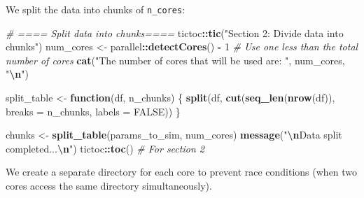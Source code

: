 \documentclass[
]{article}
\newenvironment{Shaded}{\begin{snugshade}}{\end{snugshade}}
\newcommand{\AttributeTok}[1]{\textcolor[rgb]{0.13,0.29,0.53}{#1}}
\newcommand{\CommentTok}[1]{\textcolor[rgb]{0.56,0.35,0.01}{\textit{#1}}}
\newcommand{\ConstantTok}[1]{\textcolor[rgb]{0.56,0.35,0.01}{#1}}
\newcommand{\ControlFlowTok}[1]{\textcolor[rgb]{0.13,0.29,0.53}{\textbf{#1}}}
\newcommand{\DecValTok}[1]{\textcolor[rgb]{0.00,0.00,0.81}{#1}}
\newcommand{\FunctionTok}[1]{\textcolor[rgb]{0.13,0.29,0.53}{\textbf{#1}}}
\newcommand{\NormalTok}[1]{#1}
\newcommand{\OtherTok}[1]{\textcolor[rgb]{0.56,0.35,0.01}{#1}}
\newcommand{\SpecialCharTok}[1]{\textcolor[rgb]{0.81,0.36,0.00}{\textbf{#1}}}
\newcommand{\StringTok}[1]{\textcolor[rgb]{0.31,0.60,0.02}{#1}}
\begin{document}
We split the data into chunks of \texttt{n\_cores}:

\begin{Shaded}
\begin{Highlighting}[]
\CommentTok{\# ==== Split data into chunks====}
\NormalTok{tictoc}\SpecialCharTok{::}\FunctionTok{tic}\NormalTok{(}\StringTok{"Section 2: Divide data into chunks"}\NormalTok{)}
\NormalTok{num\_cores }\OtherTok{\textless{}{-}}\NormalTok{ parallel}\SpecialCharTok{::}\FunctionTok{detectCores}\NormalTok{() }\SpecialCharTok{{-}} \DecValTok{1}  \CommentTok{\# Use one less than the total number of cores}
\FunctionTok{cat}\NormalTok{(}\StringTok{"The number of cores that will be used are: "}\NormalTok{, num\_cores, }\StringTok{"}\SpecialCharTok{\textbackslash{}n}\StringTok{"}\NormalTok{)}

\NormalTok{split\_table }\OtherTok{\textless{}{-}} \ControlFlowTok{function}\NormalTok{(df, n\_chunks) \{}
  \FunctionTok{split}\NormalTok{(df, }\FunctionTok{cut}\NormalTok{(}\FunctionTok{seq\_len}\NormalTok{(}\FunctionTok{nrow}\NormalTok{(df)), }\AttributeTok{breaks =}\NormalTok{ n\_chunks, }\AttributeTok{labels =} \ConstantTok{FALSE}\NormalTok{))}
\NormalTok{\}}

\NormalTok{chunks }\OtherTok{\textless{}{-}} \FunctionTok{split\_table}\NormalTok{(params\_to\_sim, num\_cores)}
\FunctionTok{message}\NormalTok{(}\StringTok{"}\SpecialCharTok{\textbackslash{}n}\StringTok{Data split completed...}\SpecialCharTok{\textbackslash{}n}\StringTok{"}\NormalTok{)}
\NormalTok{tictoc}\SpecialCharTok{::}\FunctionTok{toc}\NormalTok{() }\CommentTok{\# For section 2}
\end{Highlighting}
\end{Shaded}

We create a separate directory for each core to prevent race conditions
(when two cores access the same directory simultaneously).
\end{document}
